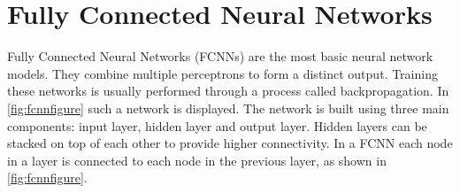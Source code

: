 

\section{Fully Connected Neural Networks}\label{sec:section}

\begingroup
Fully Connected Neural Networks (FCNNs) are the most basic neural network models. They
combine multiple perceptrons to form a distinct output. Training these networks is usually performed
through a process called backpropagation. In \autoref{fig:fcnnfigure} such a network is displayed.
The network is built using three main components: input layer, hidden layer and output layer. Hidden
layers can be stacked on top of each other to provide higher connectivity. In a FCNN
each node in a layer is connected to each node in the previous layer, as shown in \autoref{fig:fcnnfigure}.
\endgroup


